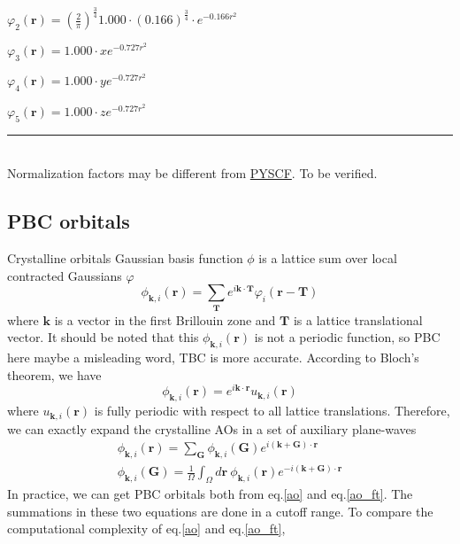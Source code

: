 \documentclass{article}
\begin{document}
        $ \varphi_2(\textbf{r}) = \left(\frac{2}{\pi}\right)^{\frac{3}{4}}
            1.000\cdot(0.166)^{\frac{3}{4}}\cdot e^{-0.166r^2} $

        $ \varphi_3(\textbf{r}) = 1.000\cdot x e^{-0.727r^2} $

        $ \varphi_4(\textbf{r}) = 1.000\cdot y e^{-0.727r^2} $

        $ \varphi_5(\textbf{r}) = 1.000\cdot z e^{-0.727r^2} $
        \hrule
        ~\\
        Normalization factors may be different from \href{https://pyscf.org/}{PYSCF}. To be verified.
        
    \subsection{PBC orbitals}
    Crystalline orbitals Gaussian basis function $\phi$ is a lattice sum over local contracted Gaussians $\varphi$
    \begin{equation}
        \phi_{\textbf{k},i}(\textbf{r}) = \sum_{\textbf{T}}e^{i\textbf{k}\cdot\textbf{T}}\varphi_i(\textbf{r}-\textbf{T})\label{ao}
    \end{equation}
    where $\textbf{k}$ is a vector in the first Brillouin zone and $\textbf{T}$ is a lattice translational vector.
    It should be noted that this $\phi_{\textbf{k},i}(\textbf{r})$ is not a periodic function, 
    so PBC here maybe a misleading word, TBC is more accurate.
    According to Bloch's theorem, we have
    \begin{equation}
        \phi_{\textbf{k},i}(\textbf{r}) = e^{i\textbf{k}\cdot\textbf{r}}u_{\textbf{k},i}(\textbf{r})
    \end{equation}
    where $u_{\textbf{k},i}(\textbf{r})$ is fully periodic with respect to all lattice translations.
    Therefore, we can exactly expand the crystalline AOs in a set of auxiliary plane-waves
    \begin{gather}
        \phi_{\textbf{k},i}(\textbf{r}) = \sum_{\textbf{G}}\phi_{\textbf{k},i}(\textbf{G})e^{i(\textbf{k}+\textbf{G})\cdot\textbf{r}}\label{ao_ft}\\
        \phi_{\textbf{k},i}(\textbf{G}) = \frac{1}{\Omega}\int_\Omega d\textbf{r}\ \phi_{\textbf{k},i}(\textbf{r})e^{-i(\textbf{k}+\textbf{G})\cdot\textbf{r}}\label{ao_ft_coeff}
    \end{gather}
    In practice, we can get PBC orbitals both from eq.\eqref{ao} and eq.\eqref{ao_ft}. 
    The summations in these two equations are done in a cutoff range.
    To compare the computational complexity of eq.\eqref{ao} and eq.\eqref{ao_ft}, 
\end{document}

